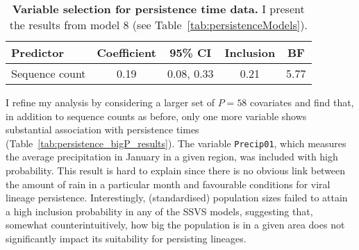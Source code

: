 \begin{minipage}{\textwidth}    
\setcounter{mpfootnote}{\value{footnote}}
\renewcommand{\thempfootnote}{\arabic{mpfootnote}}
\fontsize{9}{11}\selectfont
{}
\begin{longtable}{lcccc}
\caption[Variable selection for persistence time data.]{\textbf{Variable selection for persistence time data.}
I present the results from model 8 (see Table~\ref{tab:persistenceModels}).}
\label{tab:persistence_glm_results}\\
\toprule
Predictor\footnotemark[1] & Coefficient\footnotemark[2] & 95\% CI\footnotemark[3] & Inclusion\footnotemark[4] & BF\footnotemark[5] \\
\toprule
Sequence count & 0.19 & 0.08, 0.33 & 0.21 & 5.77 \\
\bottomrule
\end{longtable}
\setcounter{footnote}{\value{mpfootnote}}
\end{minipage}

I refine my analysis by considering a larger set of $P = 58$ covariates and find that, in addition to sequence counts as before, only one more variable shows substantial association with persistence times (Table~\ref{tab:persistence_bigP_results}).
The variable \verb|Precip01|, which measures the average precipitation in January in a given region, was included with high probability.
This result is hard to explain since there is no obvious link between the amount of rain in a particular month and favourable conditions for viral lineage persistence.
Interestingly, (standardised) population sizes failed to attain a high inclusion probability in any of the SSVS models, suggesting that, somewhat counterintuitively, how big the population is in a given area does not significantly impact its suitability for persisting lineages. 

